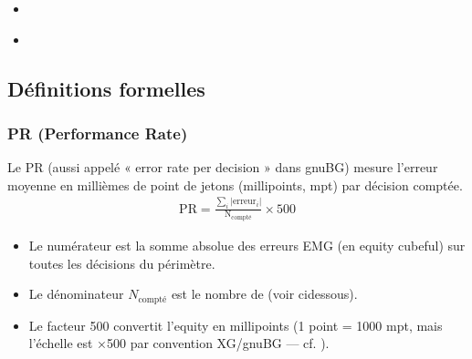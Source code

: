 \documentclass[letterpaper,10pt,french]{sphinxmanual}
\begin{document}
\begin{sphinxcontents}
\begin{itemize}
\begin{itemize}
\item {} 
\sphinxAtStartPar
{}\label{\detokenize{stats_parity:id11}}{\hyperref[\detokenize{stats_parity:comparaison-gnubg-blunderdb-import-sgf-moteurs-differents}]{}}

\end{itemize}

\item {} 
\sphinxAtStartPar
{}\label{\detokenize{stats_parity:id12}}{\hyperref[\detokenize{stats_parity:valider-vos-propres-chiffres}]{}}

\item {} 
\sphinxAtStartPar
{}\label{\detokenize{stats_parity:id13}}{\hyperref[\detokenize{stats_parity:reference-gnubg}]{}}

\end{itemize}
\end{sphinxcontents}


\subsection{Définitions formelles}
\label{\detokenize{stats_parity:definitions-formelles}}

\subsubsection{PR (Performance Rate)}
\label{\detokenize{stats_parity:pr-performance-rate}}
\sphinxAtStartPar
Le PR (aussi appelé « error rate per decision » dans gnuBG) mesure l’erreur
moyenne en millièmes de point de jetons (millipoints, mpt) par décision
comptée.
\begin{equation*}
\begin{split}\mathrm{PR} = \frac{\sum_i |\mathrm{erreur}_i|}{\mathrm{N_{compté}}} \times 500\end{split}
\end{equation*}\begin{itemize}
\item {} 
\sphinxAtStartPar
Le numérateur est la somme absolue des erreurs EMG (en equity cubeful) sur
toutes les décisions du périmètre.

\item {} 
\sphinxAtStartPar
Le dénominateur \(N_\text{compté}\) est le nombre de 
(voir ci\sphinxhyphen{}dessous).

\item {} 
\sphinxAtStartPar
Le facteur 500 convertit l’equity en millipoints (1 point = 1000 mpt, mais
l’échelle est ×500 par convention XG/gnuBG — cf. ).

\end{itemize}
\end{document}
